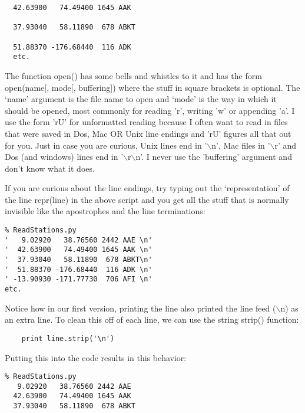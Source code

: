 {{\begin{verbatim}
  42.63900   74.49400 1645 AAK 

  37.93040   58.11890  678 ABKT

  51.88370 -176.68440  116 ADK 
  etc.
  \end{verbatim}}

\noindent The function  {\color{blue}open()} has some bells and whistles to it and has the form  {\color{blue}open(name[, mode[, buffering])} where the stuff in square brackets is optional.  The `name' argument is the file name to open and `mode' is the way in which it should be opened, most commonly for reading 'r', writing 'w' or appending 'a'.  I use the form 'rU' for unformatted reading because I often want to read in files that were saved in Dos, Mac OR Unix line endings and 'rU' figures all that out for you.  Just in case you are curious, Unix lines end in '$\backslash$n',  Mac files in '$\backslash$r' and Dos (and windows) lines end in '$\backslash$r$\backslash$n'.     I never use the 'buffering' argument and don't know what it does.  

If you are curious about the line endings, try typing out the `representation' of the line {\color{blue}repr(line)} in the above script and you get all the  stuff that is normally  invisible like the apostrophes and the line terminations:

{\singlespacing \color{blue} \begin{verbatim}
% ReadStations.py
'   9.02920   38.76560 2442 AAE \n'
'  42.63900   74.49400 1645 AAK \n'
'  37.93040   58.11890  678 ABKT\n'
'  51.88370 -176.68440  116 ADK \n'
' -13.90930 -171.77730  706 AFI \n'
etc.
\end{verbatim}}

  
\noindent Notice how in our first version, printing the line also printed the line feed ($\backslash$n) as an extra line.  To clean this off of each line, we can use the  string {\color{blue}strip()} function:  

{\singlespacing \color{blue} \begin{verbatim}
    print line.strip('\n')
\end{verbatim}}

\noindent Putting this into the code results in this behavior:

{\singlespacing \color{blue} \begin{verbatim}
% ReadStations.py
   9.02920   38.76560 2442 AAE 
  42.63900   74.49400 1645 AAK 
  37.93040   58.11890  678 ABKT
\end{verbatim}}


}
